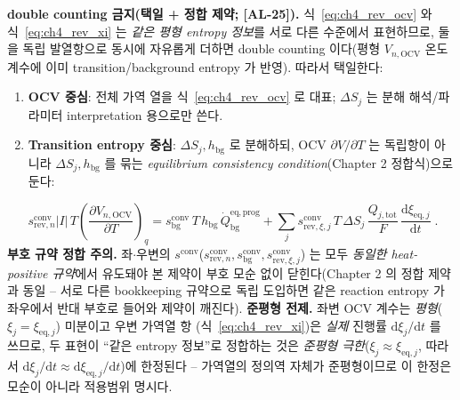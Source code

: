 \documentclass[11pt,a4paper]{article}
\newcommand{\dd}{\mathrm{d}}
\newcommand{\eq}{\mathrm{eq}}
\newcommand{\bg}{\mathrm{bg}}
\newcommand{\OCV}{\mathrm{OCV}}
\newcommand{\tot}{\mathrm{tot}}
\newcommand{\rev}{\mathrm{rev}}
\newcommand{\conv}{\mathrm{conv}}
\newcommand{\prog}{\mathrm{prog}}
\newcommand{\AL}[1]{\textsf{[AL-#1]}}
\begin{document}
\textbf{double counting 금지(택일 + 정합 제약; \AL{25}).} 식~\eqref{eq:ch4_rev_ocv} 와 식~\eqref{eq:ch4_rev_xi}
는 \emph{같은 평형 entropy 정보}를 서로 다른 수준에서 표현하므로, 둘을 독립 발열항으로 동시에 자유롭게 더하면
double counting 이다(평형 $V_{n,\OCV}$ 온도계수에 이미 transition/background entropy 가 반영). 따라서 택일한다:
\begin{enumerate}[label=\Alph*),leftmargin=2.0em]
\item \textbf{OCV 중심}: 전체 가역 열을 식~\eqref{eq:ch4_rev_ocv} 로 대표; $\Delta S_j$ 는 분해 해석/파라미터
  interpretation 용으로만 쓴다.
\item \textbf{Transition entropy 중심}: $\Delta S_j,h_\bg$ 로 분해하되, OCV $\partial V/\partial T$ 는 독립항이
  아니라 $\Delta S_j,h_\bg$ 를 묶는 \emph{equilibrium consistency condition}(Chapter 2 정합식)으로 둔다:
\end{enumerate}
\begin{equation}
\boxed{\;s_{\rev,n}^{\conv}|I|\,T\left(\frac{\partial V_{n,\OCV}}{\partial T}\right)_q
=s_\bg^{\conv}\,T\,h_\bg\,\dot Q_\bg^{\eq,\prog}
+\sum_j s_{\rev,\xi,j}^{\conv}\,T\,\Delta S_j\,\frac{Q_{j,\tot}}{F}\,\frac{\dd\xi_{\eq,j}}{\dd t}\;.}
\label{eq:ch4_consistency}
\end{equation}
\textbf{부호 규약 정합 주의.} 좌$\cdot$우변의 $s^{\conv}$($s_{\rev,n}^{\conv},s_\bg^{\conv},s_{\rev,\xi,j}^{\conv}$)
는 모두 \emph{동일한 heat-positive 규약}에서 유도돼야 본 제약이 부호 모순 없이 닫힌다(Chapter 2 의 정합 제약과
동일 -- 서로 다른 bookkeeping 규약으로 독립 도입하면 같은 reaction entropy 가 좌우에서 반대 부호로 들어와 제약이
깨진다). \textbf{준평형 전제.} 좌변 OCV 계수는 \emph{평형}($\xi_j=\xi_{\eq,j}$) 미분이고 우변 가역열 항
(식~\eqref{eq:ch4_rev_xi})은 \emph{실제} 진행률 $\dd\xi_j/\dd t$ 를 쓰므로, 두 표현이 ``같은 entropy 정보''로
정합하는 것은 \emph{준평형 극한}($\xi_j\approx\xi_{\eq,j}$, 따라서 $\dd\xi_j/\dd t\approx\dd\xi_{\eq,j}/\dd t$)에
한정된다 -- 가역열의 정의역 자체가 준평형이므로 이 한정은 모순이 아니라 적용범위 명시다.

\end{document}
